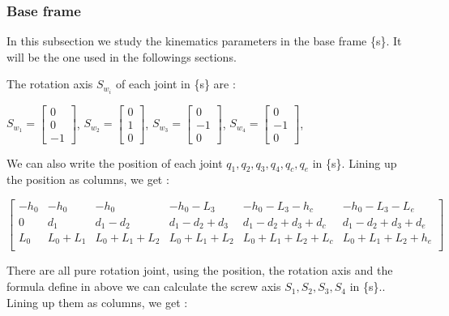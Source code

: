 \subsubsection{Base frame}

\hspace{\parindent} In this subsection we study the kinematics parameters in the base frame \{s\}. It will be the one used in the followings sections.

\bigbreak
The rotation axis $S_{w_i}$ of each joint  in \{s\} are : 
\begin{center}
    $S_{w_1} = \begin{bmatrix} 0 \\ 0 \\ -1\end{bmatrix}$,
    $S_{w_2} = \begin{bmatrix} 0 \\ 1 \\ 0\end{bmatrix}$,
    $S_{w_3} = \begin{bmatrix} 0 \\ -1 \\ 0\end{bmatrix}$,
    $S_{w_4} = \begin{bmatrix} 0 \\ -1 \\ 0\end{bmatrix}$,
\end{center}

\bigbreak
We can also write the position of each joint  $q_1,q_2,q_3,q_4,q_c,q_e$ in \{s\}. Lining up the position as columns, we get : 

\begin{center}
    $
    \begin{bmatrix}
        -h_0 & -h_0 & -h_0 & -h_0-L_3 & -h_0-L_3-h_c & -h_0-L_3-L_e  \\
        0 & d_1 & d_1-d_2 & d_1-d_2+d_3 & d_1-d_2+d_3+d_c & d_1-d_2+d_3+d_e \\
        L_0 & L_0+L_1 & L_0+L_1+L_2 & L_0+L_1+L_2 & L_0+L_1+L_2+L_c & L_0+L_1+L_2+h_e \\
    \end{bmatrix}
    $
\end{center}

\bigbreak
There are all pure rotation joint, using the position, the rotation axis and the formula define in above we can calculate the screw axis $S_1,S_2,S_3,S_4$ in \{s\}.. Lining up them as columns, we get : 

